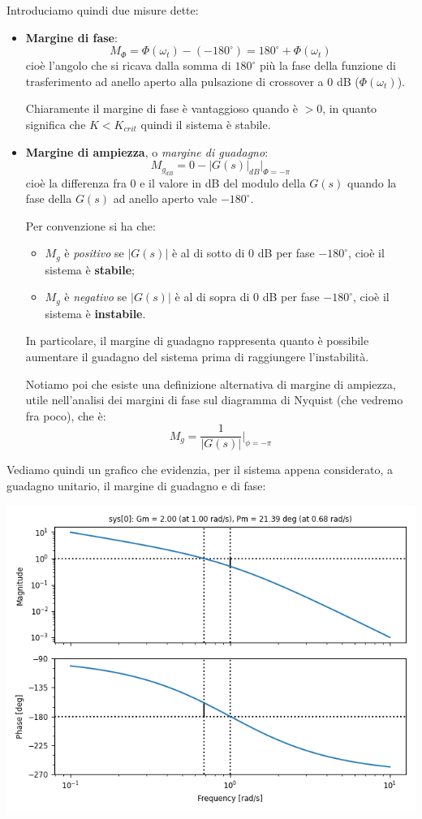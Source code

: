 \documentclass[a4paper,11pt]{article}
\begin{document}
Introduciamo quindi due misure dette:
\begin{itemize}
	\item \textbf{Margine di fase}:
		$$
		M_\Phi = \Phi(\omega_t) - (- 180^\circ) = 180^\circ + \Phi(\omega_t)
		$$
		cioè l'angolo che si ricava dalla somma di $180^\circ$ più la fase della funzione di trasferimento ad anello aperto alla pulsazione di crossover a 0 dB ($\Phi(\omega_t)$).

		Chiaramente il margine di fase è vantaggioso quando è $> 0$, in quanto significa che $K < K_{crit}$  quindi il sistema è stabile.
	\item \textbf{Margine di ampiezza}, o \textit{margine di guadagno}:
		$$
		M_{g_{dB}} = 0 - |G(s)|_{dB} \big|_{\Phi = - \pi}
		$$
		cioè la differenza fra 0 e il valore in dB del modulo della $G(s)$ quando la fase della $G(s)$ ad anello aperto vale $-180^\circ$.

		Per convenzione si ha che:
		\begin{itemize}
			\item $M_g$ è \textit{positivo} se $|G(s)|$ è al di sotto di 0 dB per fase $-180^\circ$, cioè il sistema è \textbf{stabile};
			\item $M_g$ è \textit{negativo} se $|G(s)|$ è al di sopra di 0 dB per fase $-180^\circ$, cioè il sistema è \textbf{instabile}.
		\end{itemize}

		In particolare, il margine di guadagno rappresenta quanto è possibile aumentare il guadagno del sistema prima di raggiungere l'instabilità.

		Notiamo poi che esiste una definizione alternativa di margine di ampiezza, utile nell'analisi dei margini di fase sul diagramma di Nyquist (che vedremo fra poco), che è:
		$$
		M_g = \frac{1}{|G(s)|} \Bigg|_{\phi = -\pi}
		$$
\end{itemize}

Vediamo quindi un grafico che evidenzia, per il sistema appena considerato, a guadagno unitario, il margine di guadagno e di fase:

\begin{center}
	\includegraphics[scale=0.8]{../figures/margins.png}
\end{center}
\end{document}

